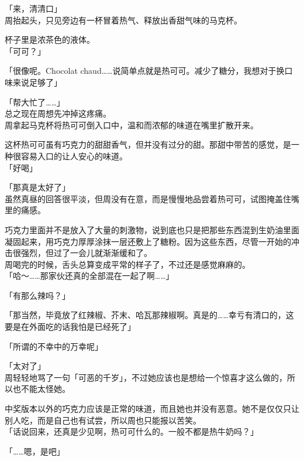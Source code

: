 「来，清清口」\\

周抬起头，只见旁边有一杯冒着热气、释放出香甜气味的马克杯。

杯子里是浓茶色的液体。\\

「可可？」

「很像呢。Chocolat chaud……说简单点就是热可可。减少了糖分，我想对于换口味来说足够了」

「帮大忙了……」\\

总之现在周想先冲掉这疼痛。\\

周拿起马克杯将热可可倒入口中，温和而浓郁的味道在嘴里扩散开来。

这杯热可可虽有巧克力的甜甜香气，但并没有过分的甜。那甜中带苦的感觉，是一种很容易入口的让人安心的味道。\\

「好喝」

「那真是太好了」\\

虽然真昼的回答很平淡，但周没有在意，而是慢慢地品尝着热可可，试图掩盖住嘴里的痛感。

巧克力里面并不是放入了大量的刺激物，说到底也只是把那些东西混到生奶油里面凝固起来，用巧克力厚厚涂抹一层还敷上了糖粉。因为这些东西，尽管一开始的冲击很强烈，但过了一会儿就渐渐缓和了。\\

周喝完的时候，舌头总算变成平常的样子了，不过还是感觉麻麻的。\\

「哈～……那家伙还真的全部混在一起了啊……」

「有那么辣吗？」

「那当然，毕竟放了红辣椒、芥末、哈瓦那辣椒啊。真是的……幸亏有清口的，这要是在外面吃的话我怕是已经死了」

「所谓的不幸中的万幸呢」

「太对了」\\

周轻轻地骂了一句「可恶的千岁」，不过她应该也是想给一个惊喜才这么做的，所以也不能太怪她。

中奖版本以外的巧克力应该是正常的味道，而且她也并没有恶意。她不是仅仅只让别人吃，而是自己也有试尝，所以周也只能报以苦笑。\\

「话说回来，还真是少见啊，热可可什么的。一般不都是热牛奶吗？」

「……嗯，是吧」

